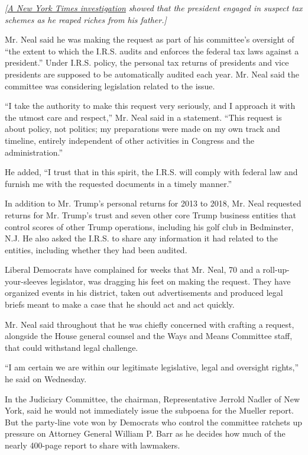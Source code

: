 \emph{{[}}\href{https://www.nytimes3xbfgragh.onion/interactive/2018/10/02/us/politics/donald-trump-tax-schemes-fred-trump.html}{\emph{A
New York Times investigation}} \emph{showed that the president engaged
in suspect tax schemes as he reaped riches from his father.{]}}

Mr. Neal said he was making the request as part of his committee's
oversight of ``the extent to which the I.R.S. audits and enforces the
federal tax laws against a president.'' Under I.R.S. policy, the
personal tax returns of presidents and vice presidents are supposed to
be automatically audited each year. Mr. Neal said the committee was
considering legislation related to the issue.

``I take the authority to make this request very seriously, and I
approach it with the utmost care and respect,'' Mr. Neal said in a
statement. ``This request is about policy, not politics; my preparations
were made on my own track and timeline, entirely independent of other
activities in Congress and the administration.''

He added, ``I trust that in this spirit, the I.R.S. will comply with
federal law and furnish me with the requested documents in a timely
manner.''

In addition to Mr. Trump's personal returns for 2013 to 2018, Mr. Neal
requested returns for Mr. Trump's trust and seven other core Trump
business entities that control scores of other Trump operations,
including his golf club in Bedminster, N.J. He also asked the I.R.S. to
share any information it had related to the entities, including whether
they had been audited.

Liberal Democrats have complained for weeks that Mr. Neal, 70 and a
roll-up-your-sleeves legislator, was dragging his feet on making the
request. They have organized events in his district, taken out
advertisements and produced legal briefs meant to make a case that he
should act and act quickly.

Mr. Neal said throughout that he was chiefly concerned with crafting a
request, alongside the House general counsel and the Ways and Means
Committee staff, that could withstand legal challenge.

``I am certain we are within our legitimate legislative, legal and
oversight rights,'' he said on Wednesday.

In the Judiciary Committee, the chairman, Representative Jerrold Nadler
of New York, said he would not immediately issue the subpoena for the
Mueller report. But the party-line vote won by Democrats who control the
committee ratchets up pressure on Attorney General William P. Barr as he
decides how much of the nearly 400-page report to share with lawmakers.

